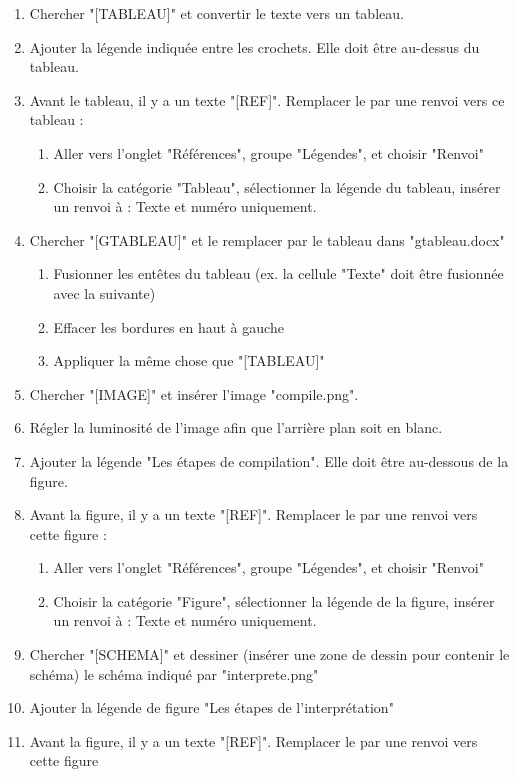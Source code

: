 \documentclass[11pt, a4paper]{article}
\begin{document}
\begin{enumerate}
	\item Chercher "[TABLEAU]" et convertir le texte vers un tableau. 
	\item Ajouter la légende indiquée entre les crochets. Elle doit être au-dessus du tableau. 
	\item Avant le tableau, il y a un texte "[REF]". Remplacer le par une renvoi vers ce tableau :
	\begin{enumerate}
		\item Aller vers l'onglet "Références", groupe "Légendes", et choisir "Renvoi"
		\item Choisir la catégorie "Tableau", sélectionner la légende du tableau, insérer un renvoi à : Texte et numéro uniquement.
	\end{enumerate}
	\item Chercher "[GTABLEAU]" et le remplacer par le tableau dans "gtableau.docx"
	\begin{enumerate}
		\item Fusionner les entêtes du tableau (ex. la cellule "Texte" doit être fusionnée avec la suivante)
		\item Effacer les bordures en haut à gauche
		\item Appliquer la même chose que "[TABLEAU]"
	\end{enumerate}
	\item Chercher "[IMAGE]" et insérer l'image "compile.png". 
	\item Régler la luminosité de l'image afin que l'arrière plan soit en blanc.
	\item Ajouter la légende "Les étapes de compilation". Elle doit être au-dessous de la figure. 
	\item Avant la figure, il y a un texte "[REF]". Remplacer le par une renvoi vers cette figure :
	\begin{enumerate}
		\item Aller vers l'onglet "Références", groupe "Légendes", et choisir "Renvoi"
		\item Choisir la catégorie "Figure", sélectionner la légende de la figure, insérer un renvoi à : Texte et numéro uniquement.
	\end{enumerate}
	\item Chercher "[SCHEMA]" et dessiner (insérer une zone de dessin pour contenir le schéma) le schéma indiqué par "interprete.png"
	\item Ajouter la légende de figure "Les étapes de l'interprétation"
	\item Avant la figure, il y a un texte "[REF]". Remplacer le par une renvoi vers cette figure

\end{enumerate}
\end{document}
